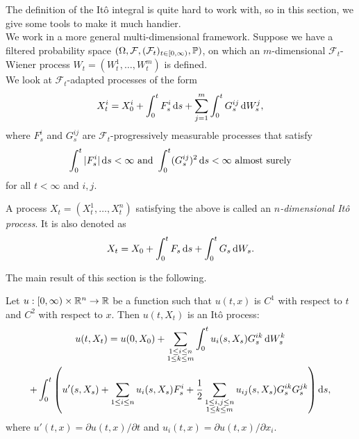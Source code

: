 The definition of the It\^{o} integral is quite hard to work with, so in this section, we give some tools to make it much handier.\\
We work in a more general multi-dimensional framework. Suppose we have a filtered probability space $(\Omega,\mathcal{F},(\mathcal{F}_t)_{t\in[0,\infty)},\mathbb{P})$, on which an $m$-dimensional $\mathcal{F}_t$-Wiener process $W_t = (W_t^1,\ldots,W_t^m)$ is defined.\\
We look at $\mathcal{F}_t$-adapted processes of the form
\[ X_t^i = X_0^i + \int_0^t F_s^i \operatorname{d}\!{s} + \sum_{j=1}^m \int_0^t G_s^{ij} \operatorname{d}\!{W}_s^j, \]
where $F_s^i$ and $G_s^{ij}$ are $\mathcal{F}_t$-progressively measurable processes that satisfy
\[ \int_0^t |F_s^i| \operatorname{d}\!{s} < \infty \text{ and } \int_0^t (G_s^{ij})^2\operatorname{d}\!{s} < \infty \text{ almost surely} \]
for all $t<\infty$ and $i,j$.

\begin{fdef}[It\^{o} Process]
	A process $X_t = (X_t^1,\ldots,X_t^n)$ satisfying the above is called an \textit{$n$-dimensional It\^{o} process}. It is also denoted as
	\begin{equation}
		\label{eqn: ito process}
		X_t = X_0 + \int_0^t F_s\operatorname{d}\!{s} + \int_0^t G_s\operatorname{d}\!{W}_s.
	\end{equation}
\end{fdef}

The main result of this section is the following.

\begin{ftheo}[It\^{o}'s Lemma]
	Let $u:[0,\infty)\times\mathbb{R}^n\to\mathbb{R}$ be a function such that $u(t,x)$ is $C^1$ with respect to $t$ and $C^2$ with respect to $x$. Then $u(t,X_t)$ is an It\^{o} process:
	\begin{multline}
		\label{eqn: ito rule}
		u(t,X_t) = u(0,X_0) + \sum_{\substack{1\leq i\leq n \\ 1\leq k\leq m}} \int_0^t u_i(s,X_s)G_s^{ik}\operatorname{d}\!{W}_s^k \\ + \int_0^t \left(u'(s,X_s) + \sum_{1\leq i\leq n} u_i(s,X_s)F_s^i + \frac{1}{2} \sum_{\substack{1\leq i,j\leq n \\ 1\leq k\leq m}} u_{ij}(s,X_s)G_s^{ik}G_s^{jk}\right)\operatorname{d}\!{s},
	\end{multline}
	where $u'(t,x) = \partial u(t,x)/\partial t$ and $u_i(t,x) = \partial u(t,x) / \partial x_i$.
\end{ftheo}

